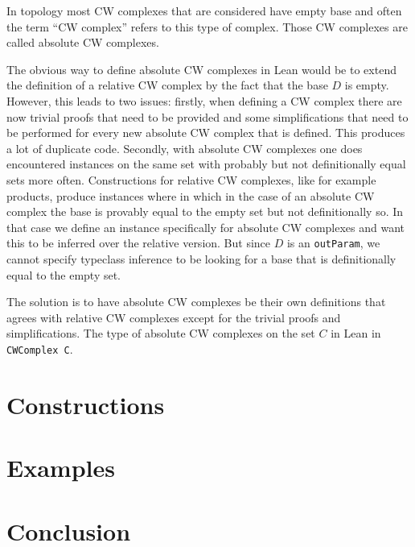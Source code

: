 In topology most CW complexes that are considered have empty base and often the term ``CW complex'' refers to this type of complex. 
Those CW complexes are called absolute CW complexes. 

The obvious way to define absolute CW complexes in Lean would be to extend the definition of a relative CW complex by the fact that the base $D$ is empty. 
However, this leads to two issues: 
firstly, when defining a CW complex there are now trivial proofs that need to be provided and some simplifications that need to be performed for every new absolute CW complex that is defined. 
This produces a lot of duplicate code. 
Secondly, with absolute CW complexes one does encountered instances on the same set with probably but not definitionally equal sets more often. 
Constructions for relative CW complexes, like for example products, produce instances where in which in the case of an absolute CW complex the base is provably equal to the empty set but not definitionally so. 
In that case we define an instance specifically for absolute CW complexes and want this to be inferred over the relative version. 
But since $D$ is an \lstinline|outParam|, we cannot specify typeclass inference to be looking for a base that is definitionally equal to the empty set. 

The solution is to have absolute CW complexes be their own definitions that agrees with relative CW complexes except for the trivial proofs and simplifications. 
The type of absolute CW complexes on the set $C$ in Lean in \lstinline|CWComplex C|. 





\section{Constructions}


\section{Examples}

\section{Conclusion}

